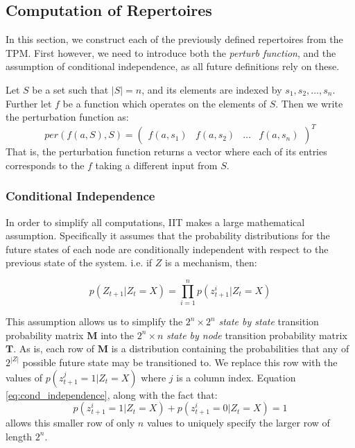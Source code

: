 \subsection{Computation of Repertoires}
\label{sec:cost}
In this section, we construct each of the previously defined repertoires from the TPM. First however, we need to introduce both the \textit{perturb function}, and the assumption of conditional independence, as all future definitions rely on these.

\begin{definition}
	{Let $S$ be a set such that $|S| = n$, and its elements are indexed by $s_1, s_2, \ldots, s_n$. Further let $f$ be a function which operates on the elements of $S$. Then we write the perturbation function as:
	\[per(f(a, S), S) = \left(\begin{array}{cccc}f(a,s_1)&f(a,s_2)&\ldots&f(a,s_n) \end{array}\right)^T\]
	That is, the perturbation function returns a vector where each of its entries corresponds to the $f$ taking a different input from $S$.}
\end{definition} 

\subsubsection{Conditional Independence}
\label{sec:conditional_independence}
In order to simplify all computations, IIT makes a large mathematical assumption. Specifically it assumes that the probability distributions for the future states of each node are conditionally independent with respect to the previous state of the system. i.e. if $Z$ is a mechanism, then:

\begin{equation}
\label{eq:cond_independence}
p(Z_{t+1}|Z_t = X) = \prod \limits_{i=1}^{n} p(z^i_{t+1}|Z_t=X)
\end{equation}

This assumption allows us to simplify the $2^n \times 2^n $ \textit{state by state} transition probability matrix $\mathbf{M}$ into the $2^n \times n$ \textit{state by node} transition probability matrix $\mathbf{T}$. As is, each row of $\mathbf{M}$ is a distribution containing the probabilities that any of $2^{|Z|}$ possible future state may be transitioned to. We replace this row with the values of $p(z^j_{t+1}=1|Z_t=X)$ where $j$ is a column index. Equation \ref{eq:cond_independence}, along with the fact that: \[p(z^i_{t+1}=1|Z_t=X)+p(z^i_{t+1} =0|Z_t=X) =1\]
allows this smaller row of only $n$ values to uniquely specify the larger row of length $2^n$.


